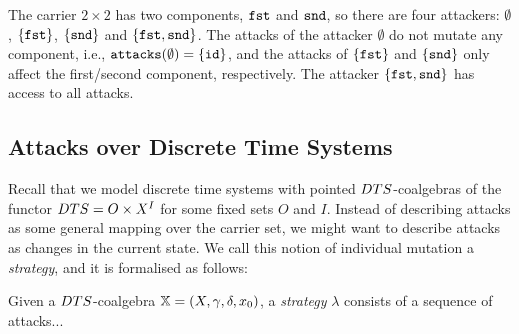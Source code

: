 % 
% 
 \begin{example}
 The carrier $2\times 2$ has two components, ${\texttt{fst}}$ and ${\texttt{snd}}$, so there are four attackers: $\emptyset$, $\left\{{\texttt{fst}}\right\}$, $\left\{{\texttt{snd}}\right\}$ and $\left\{{\texttt{fst}},{\texttt{snd}}\right\}$. The attacks of the attacker $\emptyset$ do not mutate any component, i.e., $\texttt{attacks}(\emptyset)=\left\{{\texttt{id}}\right\}$, and the attacks of $\left\{{\texttt{fst}}\right\}$ and $\left\{{\texttt{snd}}\right\}$ only affect the first/second component, respectively. The attacker $\left\{{\texttt{fst}},{\texttt{snd}}\right\}$ has access to all attacks.
 \end{example}
 
 \subsection{Attacks over Discrete Time Systems}
Recall that we model discrete time systems with pointed $DTS$-coalgebras of the functor $DTS=O\times X^I$ for some fixed sets $O$ and $I$. Instead of describing attacks as some general mapping over the carrier set, we might want to describe attacks as changes in the current state. We call this notion of individual mutation a \emph{strategy}, and it is formalised as follows:
\begin{definition}[Strategy]
Given a $DTS$-coalgebra ${\mathbb{X}}=(X,\gamma,\delta,x_0)$, a \emph{strategy} $\lambda$ consists of a sequence of attacks...
\end{definition}

